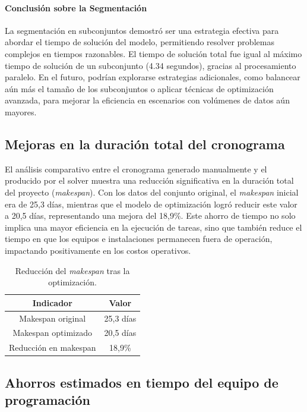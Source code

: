 \documentclass{article}
\begin{document}
\paragraph{Conclusión sobre la Segmentación}  
La segmentación en subconjuntos demostró ser una estrategia efectiva para abordar el tiempo de solución del modelo, permitiendo resolver problemas complejos en tiempos razonables. El tiempo de solución total fue igual al máximo tiempo de solución de un subconjunto (4.34 segundos), gracias al procesamiento paralelo. En el futuro, podrían explorarse estrategias adicionales, como balancear aún más el tamaño de los subconjuntos o aplicar técnicas de optimización avanzada, para mejorar la eficiencia en escenarios con volúmenes de datos aún mayores.  


\subsection{Mejoras en la duración total del cronograma}

El análisis comparativo entre el cronograma generado manualmente y el producido por el solver muestra una reducción significativa en la duración total del proyecto (\textit{makespan}). Con los datos del conjunto original, el \textit{makespan} inicial era de 25,3 días, mientras que el modelo de optimización logró reducir este valor a 20,5 días, representando una mejora del 18,9\%. Este ahorro de tiempo no solo implica una mayor eficiencia en la ejecución de tareas, sino que también reduce el tiempo en que los equipos e instalaciones permanecen fuera de operación, impactando positivamente en los costos operativos.

\begin{table}[H]
\centering
\begin{tabular}{|c|c|}
\hline
\textbf{Indicador}            & \textbf{Valor}       \\ \hline
Makespan original             & 25,3 días           \\ \hline
Makespan optimizado           & 20,5 días           \\ \hline
Reducción en makespan         & 18,9\%              \\ \hline
\end{tabular}
\caption{Reducción del \textit{makespan} tras la optimización.}
\label{tab:makespan}
\end{table}

\subsection{Ahorros estimados en tiempo del equipo de programación}
\end{document}
